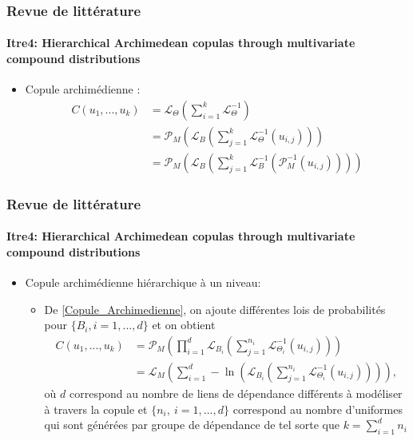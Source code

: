 \documentclass[11pt]{beamer}
\begin{document}
\begin{frame}
	\frametitle{Revue de littérature}
	\framesubtitle{Itre4: Hierarchical Archimedean copulas through multivariate compound
		distributions \cite{Itre4}}
	\begin{itemize}
		\item Copule archimédienne :
		\begin{align}
		C(u_1, ... , u_k) 
		&=  \mathcal{L}_{\Theta} \left(
		\sum_{i=1}^{k} \mathcal{L}_{\Theta}^{-1} 
		\right) \nonumber \\
		&= \mathcal{P}_{M}\left(
		\mathcal{L}_{B} \left(
		\sum_{j=1}^{k} \mathcal{L}_{\Theta}^{-1} (u_{i,j}) 
		\right) \right)										\label{Copule_Archimedienne} \\
		&= \mathcal{P}_{M}\left(
		\mathcal{L}_{B} \left(
		\sum_{j=1}^{k} \mathcal{L}_{B}^{-1} \left( 
		\mathcal{P}_{M}^{-1}(u_{i,j} ) 
		\right)\right) \right) \nonumber
		\end{align}
		
	\end{itemize}
\end{frame}


\begin{frame}
	\frametitle{Revue de littérature}
	\framesubtitle{Itre4: Hierarchical Archimedean copulas through multivariate compound
		distributions \cite{Itre4}}
	\begin{itemize}
		\item Copule archimédienne hiérarchique à un niveau: \\
		\begin{itemize}
			\item De \eqref{Copule_Archimedienne}, on ajoute différentes lois de probabilités pour $\{B_i, i =1,...,d\}$ et on obtient
			\begin{align}
			C(u_1, ... , u_k) 
			&= \mathcal{P}_{M}\left(
			\prod_{i=1}^{d} \mathcal{L}_{B_i} \left(
			\sum_{j=1}^{n_i} \mathcal{L}_{\Theta_i}^{-1} (u_{i,j}) \right) \right) \nonumber \\
			&= \mathcal{L}_{M}\left(
			\sum_{i=1}^{d} - \ln \left(
			\mathcal{L}_{B_i}\left(
			\sum_{j=1}^{n_i} \mathcal{L}_{\Theta_i}^{-1} (u_{i,j})
			\right) \right)\right), \label{Copule_Archimedienne_hierarchique}
			\end{align}
			où $d$ correspond au nombre de liens de dépendance différents à modéliser à travers la copule et $\{n_i,\ i=1,...,d\}$ correspond au nombre d'uniformes qui sont générées par groupe de dépendance de tel sorte que $k = \sum_{i=1}^{d} n_i$
			
		\end{itemize}
		
	\end{itemize}
\end{frame}
\end{document}
